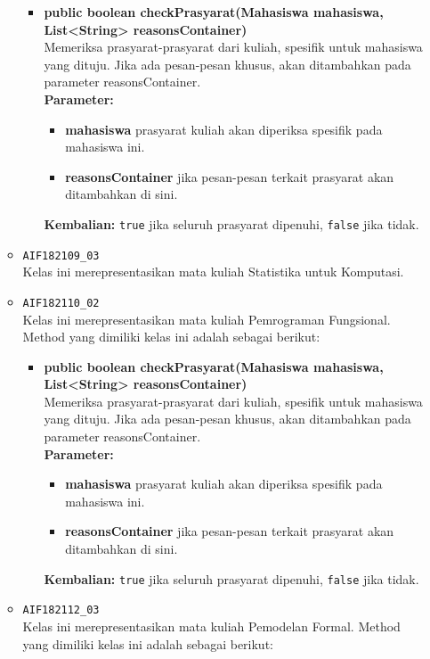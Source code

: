 \begin{enumerate}
\begin{itemize}
		\begin{itemize}
			\item \textbf{public boolean checkPrasyarat(Mahasiswa mahasiswa, List<String> reasonsContainer)}\\
			Memeriksa prasyarat-prasyarat dari kuliah, spesifik untuk mahasiswa yang dituju. Jika ada pesan-pesan khusus, akan ditambahkan pada parameter reasonsContainer.\\
			\textbf{Parameter:}
			\begin{itemize}
				\item \textbf{mahasiswa} prasyarat kuliah akan diperiksa spesifik pada mahasiswa ini.
				\item \textbf{reasonsContainer} jika pesan-pesan terkait prasyarat akan ditambahkan di sini.
			\end{itemize}
			\textbf{Kembalian:} \texttt{true} jika seluruh prasyarat dipenuhi, \texttt{false} jika tidak.
		\end{itemize}
		\item \texttt{AIF182109\_03} \\
		Kelas ini merepresentasikan mata kuliah Statistika untuk Komputasi.
		\item \texttt{AIF182110\_02} \\
		Kelas ini merepresentasikan mata kuliah Pemrograman Fungsional. Method yang dimiliki kelas ini adalah sebagai berikut: 
		\begin{itemize}
			\item \textbf{public boolean checkPrasyarat(Mahasiswa mahasiswa, List<String> reasonsContainer)}\\
			Memeriksa prasyarat-prasyarat dari kuliah, spesifik untuk mahasiswa yang dituju. Jika ada pesan-pesan khusus, akan ditambahkan pada parameter reasonsContainer.\\
			\textbf{Parameter:}
			\begin{itemize}
				\item \textbf{mahasiswa} prasyarat kuliah akan diperiksa spesifik pada mahasiswa ini.
				\item \textbf{reasonsContainer} jika pesan-pesan terkait prasyarat akan ditambahkan di sini.
			\end{itemize}
			\textbf{Kembalian:} \texttt{true} jika seluruh prasyarat dipenuhi, \texttt{false} jika tidak.
		\end{itemize}
		\item \texttt{AIF182112\_03} \\
		Kelas ini merepresentasikan mata kuliah Pemodelan Formal. Method yang dimiliki kelas ini adalah sebagai berikut: 

\end{itemize}
\end{enumerate}
